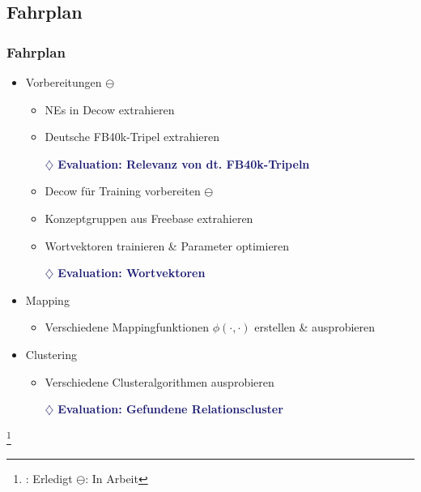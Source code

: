 \documentclass[10pt,xcolor={usenames,dvipsnames,svgnames,table}]{beamer}
\newcommand\blfootnote[1]{%
  \begingroup
  \renewcommand\thefootnote{}\footnote{#1}%
  \addtocounter{footnote}{-1}%
  \endgroup
}
\begin{document}
\begin{frame}
	\section{Fahrplan}
	\frametitle{Fahrplan}
	\begin{itemize}
		\item Vorbereitungen \textcolor{Bittersweet}{$\ominus$}
		\begin{itemize}
			\item NEs in Decow extrahieren \textcolor{ForestGreen}{\checkmark}
			\item Deutsche FB40k-Tripel extrahieren \textcolor{ForestGreen}{\checkmark}
			\item[\textcolor{MidnightBlue}{\textbf{$\diamondsuit$}}] \textcolor{MidnightBlue}{\textbf{Evaluation: Relevanz von dt. FB40k-Tripeln}} \textcolor{ForestGreen}{\checkmark}
			\item Decow für Training vorbereiten \textcolor{Bittersweet}{$\ominus$}
			\item Konzeptgruppen aus Freebase extrahieren
			\item Wortvektoren trainieren \& Parameter optimieren
			\item[\textcolor{MidnightBlue}{\textbf{$\diamondsuit$}}] \textcolor{MidnightBlue}{\textbf{Evaluation: Wortvektoren}}
		\end{itemize}
		\item Mapping
		\begin{itemize}
			\item Verschiedene Mappingfunktionen $\phi(\cdot, \cdot)$ erstellen \& ausprobieren
		\end{itemize}
		\item Clustering
		\begin{itemize}
			\item Verschiedene Clusteralgorithmen ausprobieren
			\item[\textcolor{MidnightBlue}{\textbf{$\diamondsuit$}}] \textcolor{MidnightBlue}{\textbf{Evaluation: Gefundene Relationscluster}}
		\end{itemize}
	\end{itemize}
	\blfootnote{\textcolor{ForestGreen}{\checkmark}: Erledigt \hspace{0.25cm} \textcolor{Bittersweet}{$\ominus$}: In Arbeit}
\end{frame}
\end{document}
